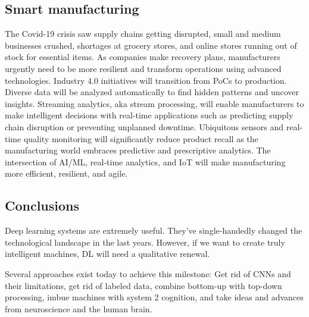 \documentclass{article}
\begin{document}
\subsection{Smart manufacturing}
The Covid-19 crisis saw supply chains getting disrupted, small and medium businesses crushed,  shortages at grocery stores, and online stores running out of stock for essential items. 
As companies make recovery plans, manufacturers urgently need to be more resilient and transform operations using advanced technologies. Industry 4.0 initiatives will transition from PoCs to production. Diverse data will be analyzed automatically to find hidden patterns and uncover insights. Streaming analytics, aka stream processing, will enable manufacturers to make intelligent decisions with real-time applications such as predicting supply chain disruption or preventing unplanned downtime. Ubiquitous sensors and real-time quality monitoring will significantly reduce product recall as the manufacturing world embraces predictive and prescriptive analytics. The intersection of AI/ML, real-time analytics, and IoT will make manufacturing more efficient, resilient, and agile. 

\subsection{Conclusions}
Deep learning systems are extremely useful. They’ve single-handedly changed the technological landscape in the last years. However, if we want to create truly intelligent machines, DL will need a qualitative renewal.

Several approaches exist today to achieve this milestone: Get rid of CNNs and their limitations, get rid of labeled data, combine bottom-up with top-down processing, imbue machines with system 2 cognition, and take ideas and advances from neuroscience and the human brain.
\end{document}
